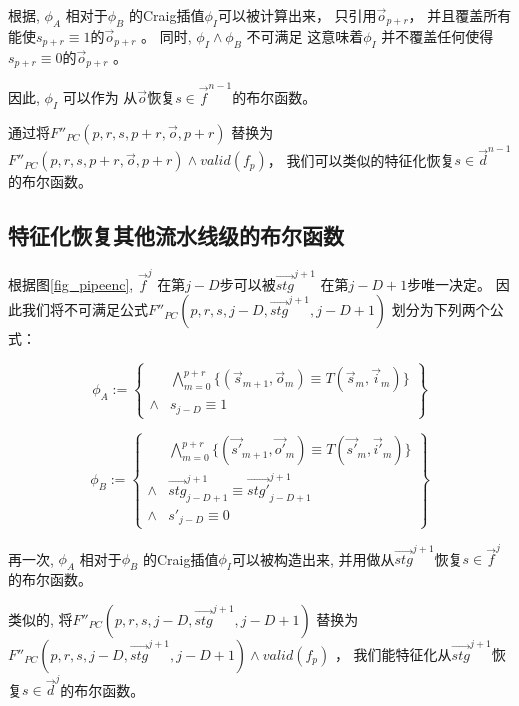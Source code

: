 根据\cite{InterpBoolFunction},
$\phi_A$ 相对于$\phi_B$ 的Craig插值$\phi_I$可以被计算出来，
只引用$\vec{o}_{p+r}$，
并且覆盖所有能使$s_{p+r}\equiv 1$的$\vec{o}_{p+r}$ 。
同时,
$\phi_I\wedge \phi_B$ 不可满足
这意味着$\phi_I$ 并不覆盖任何使得$s_{p+r}\equiv 0$的$\vec{o}_{p+r}$ 。

因此,
$\phi_I$ 可以作为
从$\vec{o}$恢复$s\in \vec{f}^{n-1}$的布尔函数。

通过将$F''_{PC}(p,r,s,p+r,\vec{o},p+r)$ 替换为$F''_{PC}(p,r,s,p+r,\vec{o},p+r)\wedge valid(f_p)$，
我们可以类似的特征化恢复$s\in\vec{d}^{n-1}$的布尔函数。

\subsection{特征化恢复其他流水线级的布尔函数}
根据图\ref{fig_pipeenc},
$\vec{f}^j$ 在第$j-D$步可以被$\vec{stg}^{j+1}$ 在第$j-D+1$步唯一决定。
因此我们将不可满足公式$F''_{PC}(p,r,s,j-D,\vec{stg}^{j+1},j-D+1)$
划分为下列两个公式：

\begin{equation}
 \phi_A :=
 \left\{
\begin{array}{cc}
&\bigwedge_{m=0}^{p+r}
\{
(\vec{s}_{m+1},\vec{o}_m)\equiv T(\vec{s}_m,\vec{i}_m)
\}
\\
\wedge& s_{j-D}\equiv 1
\end{array}
\right\}
\end{equation}

\begin{equation}
\phi_B :=
\left\{
\begin{array}{cc}
&\bigwedge_{m=0}^{p+r}
\{
(\vec{s'}_{m+1},\vec{o'}_m)\equiv T(\vec{s'}_m,\vec{i'}_m)
\}
\\
\wedge&\vec{stg}^{j+1}_{j-D+1}\equiv \vec{stg'}^{j+1}_{j-D+1} \\
\wedge& s'_{j-D}\equiv 0
\end{array}
\right\}
\end{equation}

再一次,
$\phi_A$ 相对于$\phi_B$ 的Craig插值$\phi_I$可以被构造出来,
并用做从$\vec{stg}^{j+1}$恢复$s\in\vec{f}^{j}$的布尔函数。

类似的,
将$F''_{PC}(p,r,s,j-D,\vec{stg}^{j+1},j-D+1)$  替换为
$F''_{PC}(p,r,s,j-D,\vec{stg}^{j+1},j-D+1)\wedge valid(f_p)$ ，
我们能特征化从$\vec{stg}^{j+1}$恢复$s\in\vec{d}^{j}$的布尔函数。

